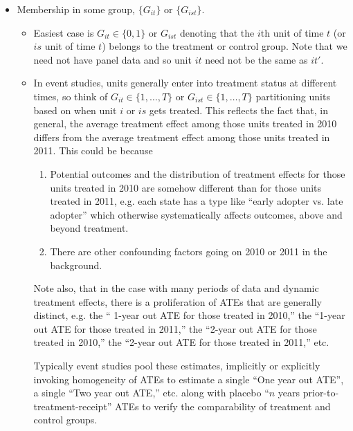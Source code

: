 \documentclass[12pt]{article}
\theoremstyle{plain}
\theoremstyle{definition}
\theoremstyle{remark}
\begin{document}
\begin{itemize}
  \item Membership in some group, $\{G_{it}\}$ or $\{G_{ist}\}$.
    \begin{itemize}
      \item Easiest case is $G_{it}\in\{0,1\}$ or $G_{ist}$ denoting that
        the $i$th unit of time $t$ (or $is$ unit of time $t$) belongs to
        the treatment or control group.
        Note that we need not have panel data and so unit $it$ need not
        be the same as $it'$.
      \item In event studies, units generally enter into treatment
        status at different times, so think of
        $G_{it}\in \{1,\ldots,T\}$ or $G_{ist}\in\{1,\ldots,T\}$
        partitioning units based on when unit $i$ or $is$ gets treated.
        This reflects the fact that, in general, the average treatment
        effect among those units treated in 2010 differs from the
        average treatment effect among those units treated in 2011.
        This could be because
        \begin{enumerate}[label=(\roman*)]
          \item Potential outcomes and the distribution of treatment
            effects for those units treated in 2010 are somehow
            different than for those units treated in 2011, e.g. each
            state has a type like ``early adopter vs. late adopter''
            which otherwise systematically affects outcomes, above and
            beyond treatment.
          \item
            There are other confounding factors going on 2010 or 2011 in
            the background.
        \end{enumerate}
        Note also, that in the case with many periods of data and
        dynamic treatment effects, there is a proliferation of ATEs that
        are generally distinct, e.g.
        the `` 1-year out ATE for those treated in 2010,''
        the ``1-year out ATE for those treated in 2011,''
        the ``2-year out ATE for those treated in 2010,''
        the ``2-year out ATE for those treated in 2011,''
        etc.

        Typically event studies pool these estimates, implicitly
        or explicitly invoking homogeneity of ATEs to estimate a
        single ``One year out ATE'', a single ``Two year out ATE,'' etc.
        along with placebo ``$n$ years prior-to-treatment-receipt'' ATEs
        to verify the comparability of treatment and control groups.


    \end{itemize}
\end{itemize}
\end{document}
